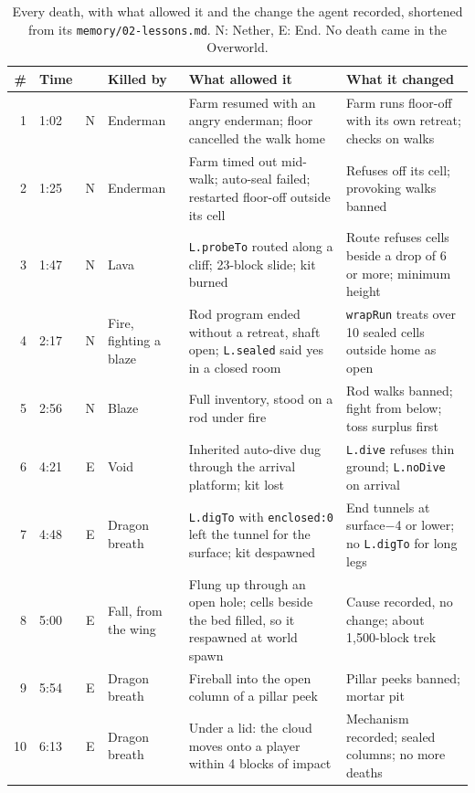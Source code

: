 \documentclass[11pt,a4paper]{article}
\begin{document}
\begin{table}[t]
  \caption{Every death, with what allowed it and the change the agent recorded, shortened from its \texttt{memory/02-lessons.md}. N: Nether, E: End. No death came in the Overworld.}
  \label{tab:deaths}
  \footnotesize
  \setlength{\tabcolsep}{4pt}
  \begin{tabularx}{\textwidth}{@{}rlclXX@{}}
    \toprule
    \textbf{\#} & \textbf{Time} & & \textbf{Killed by} & \textbf{What allowed it} & \textbf{What it changed} \\
    \midrule
    1 & 1:02 & N & Enderman & Farm resumed with an angry enderman; floor cancelled the walk home & Farm runs floor-off with its own retreat; checks on walks \\
    2 & 1:25 & N & Enderman & Farm timed out mid-walk; auto-seal failed; restarted floor-off outside its cell & Refuses off its cell; provoking walks banned \\
    3 & 1:47 & N & Lava & \texttt{L.probeTo} routed along a cliff; 23-block slide; kit burned & Route refuses cells beside a drop of 6 or more; minimum height \\
    4 & 2:17 & N & Fire, fighting a blaze & Rod program ended without a retreat, shaft open; \texttt{L.sealed} said yes in a closed room & \texttt{wrapRun} treats over 10 sealed cells outside home as open \\
    5 & 2:56 & N & Blaze & Full inventory, stood on a rod under fire & Rod walks banned; fight from below; toss surplus first \\
    6 & 4:21 & E & Void & Inherited auto-dive dug through the arrival platform; kit lost & \texttt{L.dive} refuses thin ground; \texttt{L.noDive} on arrival \\
    7 & 4:48 & E & Dragon breath & \texttt{L.digTo} with \texttt{enclosed:0} left the tunnel for the surface; kit despawned & End tunnels at surface$-$4 or lower; no \texttt{L.digTo} for long legs \\
    8 & 5:00 & E & Fall, from the wing & Flung up through an open hole; cells beside the bed filled, so it respawned at world spawn & Cause recorded, no change; about 1,500-block trek \\
    9 & 5:54 & E & Dragon breath & Fireball into the open column of a pillar peek & Pillar peeks banned; mortar pit \\
    10 & 6:13 & E & Dragon breath & Under a lid: the cloud moves onto a player within 4 blocks of impact & Mechanism recorded; sealed columns; no more deaths \\
    \bottomrule
  \end{tabularx}
\end{table}
\end{document}
